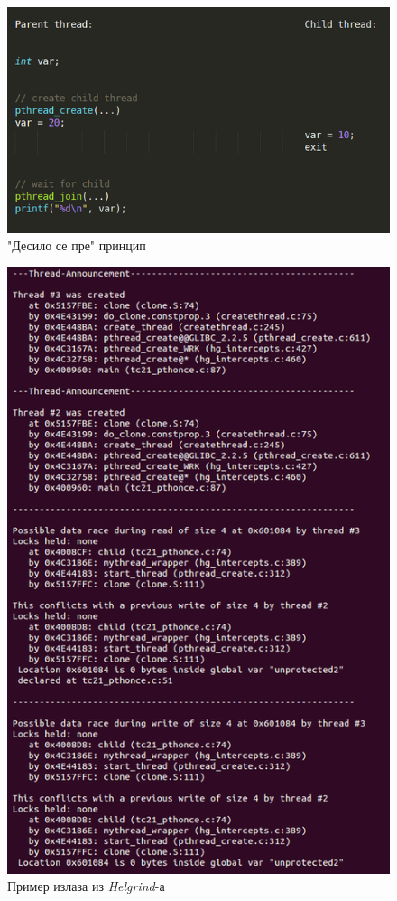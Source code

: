 \documentclass[12pt,oneside]{memoir}
\begin{document}
\begin{figure}[h!]
\begin{center}
\includegraphics[scale=0.75]{slika16.png}
\end{center}
\caption{"Десило се пре" принцип}
\label{fig:dspPrincip}
\end{figure}

\begin{figure}[h!]
\begin{center}
\includegraphics[scale=0.75]{slika17.png}
\end{center}
\caption{Пример излаза из \textit{Helgrind}-а}
\label{fig:helgrind}
\end{figure}
\end{document}
